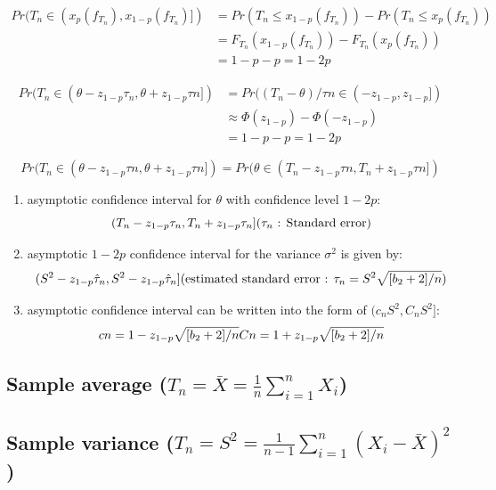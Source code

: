 \begin{align*}
    Pr(T_n \in (x_p( f_{T_n} ), x_{1-p}( f_{T_n} )]) 
    &= Pr(T_n \leq x_{1-p}( f_{T_n} )) - Pr(T_n \leq x_p( f_{T_n} ))\\
    &= F_{T_n} (x_{1-p}( f_{T_n} )) - F_{T_n} (x_p( f_{T_n} ))\\
    &= 1 - p - p = 1 - 2p
\end{align*}

\begin{align*}
    Pr(T_n \in (\theta  - z_{1-p}\tau_n, \theta  + z_{1-p}\tau n]) 
    &= Pr((T_n - \theta  )/\tau n \in (-z_{1-p},z_{1-p}])\\
    &\approx \Phi (z_{1-p}) - \Phi (-z_{1-p})\\
    &= 1 - p - p = 1 - 2p
\end{align*}

\[
    Pr(T_n \in (\theta  - z_{1-p}\tau n, \theta  + z_{1-p}\tau n]) =
    Pr(\theta  \in (T_n - z_{1-p}\tau n, T_n + z_{1-p}\tau n])
\]

\begin{enumerate}
    \item asymptotic confidence interval for $\theta$ with confidence level $1 - 2p$:
    \[
        (T_n - z_{1-p}\tau_n, T_n + z_{1-p}\tau_n]
        \hfill
        \text{($\tau_n$ : Standard error)}
    \]

    \item asymptotic $1 - 2p$ confidence interval for the variance $\sigma^2$ is given by:
    \[
        (S^2 - z_{1-p}\hat{\tau}_n, S^2 - z_{1-p}\hat{\tau}_n]
        \hfill
        (\text{estimated standard error : } \tau_n = S^2\sqrt{[b_2 + 2]/n})
    \]

    \item asymptotic confidence interval can be written into the form of $(c_n S^2,C_n S^2]$:
    \[
        \hfill
        cn = 1 - z_{1-p}\sqrt{[b_2 + 2]/n} 
        \hfill
        Cn = 1 + z_{1-p}\sqrt{[b_2 + 2]/n} 
        \hfill
    \]
\end{enumerate}


\subsection{Sample average ($T_n = \bar{X} = \frac{1}{n}\sum_{i=1}^{n} X_i $) \cite{ism-1}}

\subsection{Sample variance ($T_n = S^2 = \frac{1}{n-1}\sum_{i=1}^{n} (X_i - \bar{X})^2$) \cite{ism-1}}


